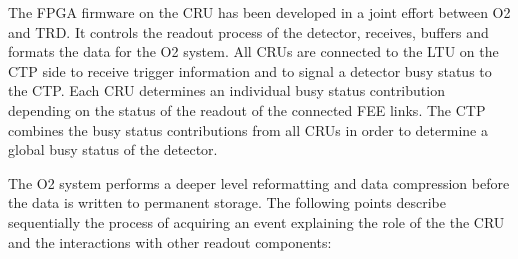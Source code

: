 The FPGA firmware on the CRU has been developed in a joint effort between O2 and TRD. It controls the readout process of the detector, receives, buffers and formats the data for the O2 system. All CRUs are connected to the LTU on the CTP side to receive trigger information and to signal a detector busy status to the CTP. Each CRU determines an individual busy status contribution depending on the status of the readout of the connected FEE links. The CTP combines the busy status contributions from all CRUs in order to determine a global busy status of the detector.

The O2 system performs  a deeper level reformatting and data compression before the data is written to permanent storage.
The following points describe sequentially the process of acquiring an event explaining the role of the the CRU and the interactions with other readout components:

